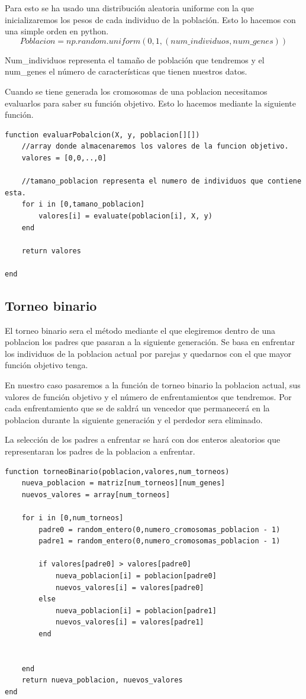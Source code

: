 \documentclass[titlepage]{article}
\begin{document}
	Para esto se ha usado una distribución aleatoria uniforme con la que  inicializaremos los pesos de cada individuo de la población. 
	Esto lo hacemos con una simple orden en python. 
	$$
		Poblacion = np.random.uniform(0,1,(num\_individuos, num\_genes))
	$$ 
	
	Num\_individuos representa el tamaño de población que tendremos y el num\_genes el número de características que tienen nuestros datos.
	
	Cuando se tiene generada los cromosomas de una poblacion necesitamos evaluarlos para saber su función objetivo. Esto lo hacemos mediante la siguiente función.
	
	\begin{lstlisting}
function evaluarPobalcion(X, y, poblacion[][])
	//array donde almacenaremos los valores de la funcion objetivo.
	valores = [0,0,..,0]
		
	//tamano_poblacion representa el numero de individuos que contiene esta.
	for i in [0,tamano_poblacion]
		valores[i] = evaluate(poblacion[i], X, y)
	end
		
	return valores
			
end
	\end{lstlisting}
	\newpage
	
	\subsection{Torneo binario}
	
	El torneo binario sera el método mediante el que elegiremos dentro de una poblacion los padres que pasaran a la siguiente generación.
	Se basa en enfrentar los individuos de la poblacion actual por parejas y quedarnos con el que mayor función objetivo tenga. 
	
	En nuestro caso pasaremos a la función de torneo binario la poblacion actual, sus valores de función objetivo y el número de enfrentamientos que tendremos. Por cada enfrentamiento que se de saldrá un vencedor que permanecerá en la poblacion durante la siguiente generación y el perdedor sera eliminado. 
	
	La selección de los padres a enfrentar se hará con dos enteros aleatorios que representaran los padres de la poblacion a enfrentar.
	\begin{lstlisting}
function torneoBinario(poblacion,valores,num_torneos)
	nueva_poblacion = matriz[num_torneos][num_genes]
	nuevos_valores = array[num_torneos]
	
	for i in [0,num_torneos]
		padre0 = random_entero(0,numero_cromosomas_poblacion - 1)
		padre1 = random_entero(0,numero_cromosomas_poblacion - 1)
		
		if valores[padre0] > valores[padre0]
			nueva_poblacion[i] = poblacion[padre0]
			nuevos_valores[i] = valores[padre0]
		else
			nueva_poblacion[i] = poblacion[padre1]
			nuevos_valores[i] = valores[padre1]
		end
		
		
	end
	return nueva_poblacion, nuevos_valores
end
	\end{lstlisting}
	
\end{document}
